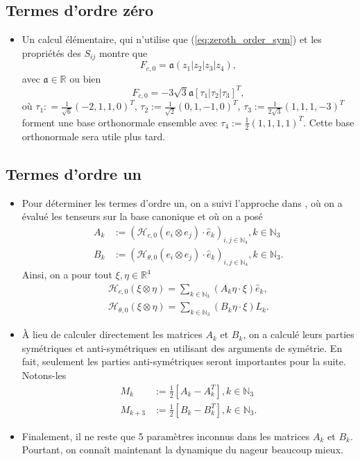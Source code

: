 \documentclass[12pt,a4paper]{article}
\theoremstyle{plain}
\theoremstyle{plain}
\theoremstyle{plain}
\theoremstyle{definition}
\theoremstyle{definition}
\theoremstyle{definition}
\theoremstyle{plain}
\newcommand{\N}{\mathbb{N}}
\newcommand{\R}{\mathbb{R}}
\newcommand{\h}{\mathcal{H}}
\begin{document}
\subsection{Termes d'ordre zéro}
\begin{itemize}
\item Un calcul élémentaire, qui n'utilise que (\ref{eq:zeroth_order_sym}) et les propriétés des $S_{ij}$ montre que
\begin{equation}
	F_{c,0} = \mathfrak{a} (z_1 |z_2| z_3|z_4),
\end{equation}
avec $\mathfrak{a} \in \R$ ou bien
\begin{equation}
	F_{c,0} = - 3 \sqrt{3} \mathfrak{a} [\tau_1| \tau_2 |\tau_3]^T,
\end{equation}
où $\tau_1 : = \tfrac{1}{\sqrt{6}}(-2,1,1,0)^T$, $\tau_2 := \tfrac{1}{\sqrt{2}}(0,1,-1,0)^T$, $\tau_{3}:= \tfrac{1}{2 \sqrt{3}} (1,1,1,-3)^T$ forment une base orthonormale ensemble avec $\tau_4:= \tfrac{1}{2}(1,1,1,1)^T$. Cette base orthonormale sera utile plus tard.
\end{itemize}

\subsection{Termes d'ordre un}
\begin{itemize}
\item Pour déterminer les termes d'ordre un, on a suivi l'approche dans \cite{Alouges2017}, où on a évalué les tenseurs sur la base canonique et où on a posé
\begin{align}
A_k &:= (\h_{c,0}(e_i \otimes e_j)\cdot \hat{e}_k)_{i,j \in \N_4}, k \in \N_3\\
B_k &:= (\h_{\theta,0}(e_i \otimes e_j)\cdot \hat{e}_k)_{i,j \in \N_4}, k \in \N_3.
\end{align}
Ainsi, on a pour tout $\xi, \eta \in \R^4$
\begin{align}
\label{eq: matrix representation of spatial first order term}
	\h_{c,0}(\xi \otimes \eta) = \sum_{k \in \N_3}(A_k \eta \cdot \xi)\hat{e}_k, \\
\label{eq: matrix representation of angular first order term}
	\h_{\theta, 0}(\xi \otimes \eta) = \sum_{k \in \N_3}(B_k \eta \cdot \xi) L_k.
\end{align}

\item À lieu de calculer directement les matrices $A_k$ et $B_k$, on a calculé leurs parties symétriques et anti-symétriques en utilisant des arguments de symétrie. En fait, seulement les parties anti-symétriques seront importantes pour la suite. Notons-les
\begin{align}
M_k &:= \frac{1}{2}[A_k - A_k^T], k \in \N_3\\
M_{k + 3} &:= \frac{1}{2}[B_k - B_k^T], k \in \N_3.
\end{align}

\item Finalement, il ne reste que 5 paramètres inconnus dans les matrices $A_k$ et $B_k$. Pourtant, on connaît maintenant la dynamique du nageur beaucoup mieux.
\end{itemize}
\end{document}
